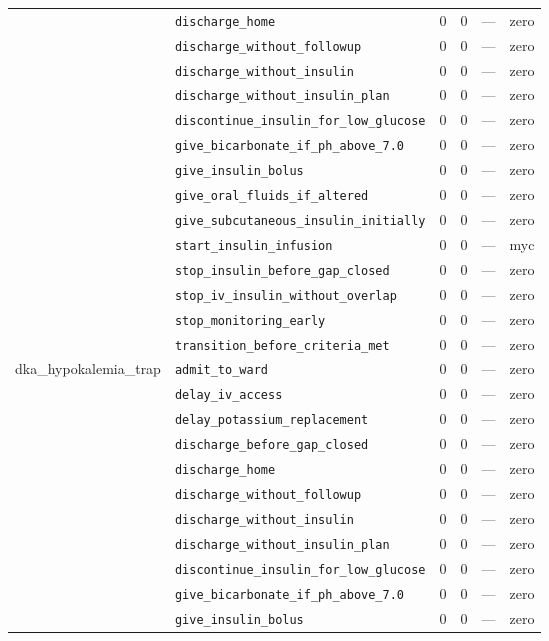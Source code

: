 \begin{table}[ht]
\begin{tabular}{llrrrl}
 & \texttt{discharge\_home} & 0 & 0 & — & zero \\
 & \texttt{discharge\_without\_followup} & 0 & 0 & — & zero \\
 & \texttt{discharge\_without\_insulin} & 0 & 0 & — & zero \\
 & \texttt{discharge\_without\_insulin\_plan} & 0 & 0 & — & zero \\
 & \texttt{discontinue\_insulin\_for\_low\_glucose} & 0 & 0 & — & zero \\
 & \texttt{give\_bicarbonate\_if\_ph\_above\_7.0} & 0 & 0 & — & zero \\
 & \texttt{give\_insulin\_bolus} & 0 & 0 & — & zero \\
 & \texttt{give\_oral\_fluids\_if\_altered} & 0 & 0 & — & zero \\
 & \texttt{give\_subcutaneous\_insulin\_initially} & 0 & 0 & — & zero \\
 & \texttt{start\_insulin\_infusion} & 0 & 0 & — & myc \\
 & \texttt{stop\_insulin\_before\_gap\_closed} & 0 & 0 & — & zero \\
 & \texttt{stop\_iv\_insulin\_without\_overlap} & 0 & 0 & — & zero \\
 & \texttt{stop\_monitoring\_early} & 0 & 0 & — & zero \\
 & \texttt{transition\_before\_criteria\_met} & 0 & 0 & — & zero \\
\midrule
dka\_hypokalemia\_trap & \texttt{admit\_to\_ward} & 0 & 0 & — & zero \\
 & \texttt{delay\_iv\_access} & 0 & 0 & — & zero \\
 & \texttt{delay\_potassium\_replacement} & 0 & 0 & — & zero \\
 & \texttt{discharge\_before\_gap\_closed} & 0 & 0 & — & zero \\
 & \texttt{discharge\_home} & 0 & 0 & — & zero \\
 & \texttt{discharge\_without\_followup} & 0 & 0 & — & zero \\
 & \texttt{discharge\_without\_insulin} & 0 & 0 & — & zero \\
 & \texttt{discharge\_without\_insulin\_plan} & 0 & 0 & — & zero \\
 & \texttt{discontinue\_insulin\_for\_low\_glucose} & 0 & 0 & — & zero \\
 & \texttt{give\_bicarbonate\_if\_ph\_above\_7.0} & 0 & 0 & — & zero \\
 & \texttt{give\_insulin\_bolus} & 0 & 0 & — & zero \\

\end{tabular}
\end{table}
